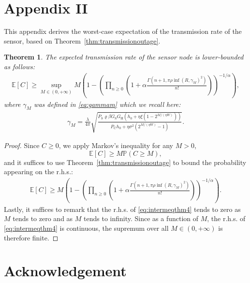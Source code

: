 \documentclass[12pt,draftclsnofoot,onecolumn]{IEEEtran}
\newtheorem{theorem}{Theorem}
\begin{document}
\section*{{\bf Appendix II}} \label{app2}
This appendix derives the worst-case expectation of the transmission rate of the sensor, based on Theorem~\ref{thm:transmissionoutage}.

\begin{theorem}
\label{thm:evRi}
The expected transmission rate of the sensor node is lower-bounded as follows:
\begin{eqnarray}
\label{eq:evRi2}
 \mathbb{E}[C] \ge \sup_{M\in(0,+\infty)}M\left(1-\left(\prod_{n\ge 0} \left(1+\alpha  \frac{\Gamma(n+1, \pi\rho\inf(R,{\gamma}_M)^2)}{n!}\right)\right)^{-1/\alpha}\right),
\end{eqnarray}
where $\gamma_M$ was defined in \eqref{eq:gammam} which we recall here:
\begin{eqnarray}
	\gamma_M=\frac\lambda{4\pi}\sqrt{ \frac{P_{\mathrm S}\varrho\beta G_{\mathrm{S}} G_{\mathrm{H}}\left(h_0+\eta\xi\left(1-2^{M/(\eta W)}\right)\right)}{P_{\mathrm C}h_0+\eta\sigma^2\left(2^{M/(\eta W)}-1\right)}}.
\end{eqnarray}
\end{theorem}
\begin{proof}
Since $C\ge 0$, we apply Markov's inequality for any $M>0$,
\begin{equation*}
\mathbb{E}[C] \ge M\mathbb P\left(C\ge M\right),
\end{equation*}
and it suffices to use Theorem~\ref{thm:transmissionoutage} to bound the probability appearing on the r.h.s.:
\begin{eqnarray}
\label{eq:intermeqthm4}
 \mathbb{E}[C] \ge M \left(1-\left(\prod_{n\ge 0} \left(1+\alpha  \frac{\Gamma(n+1,  \pi\rho\inf(R,{\gamma}_M)^2)}{n!}\right)\right)^{-1/\alpha}\right).
\end{eqnarray}
Lastly, it suffices to remark that the r.h.s. of \eqref{eq:intermeqthm4} tends to zero as $M$ tends to zero and as $M$ tends to infinity. Since as a function of $M$, the r.h.s. of \eqref{eq:intermeqthm4} is continuous, the supremum over all $M\in(0,+\infty)$ is therefore finite.
\end{proof}



\section*{Acknowledgement}
\end{document}

